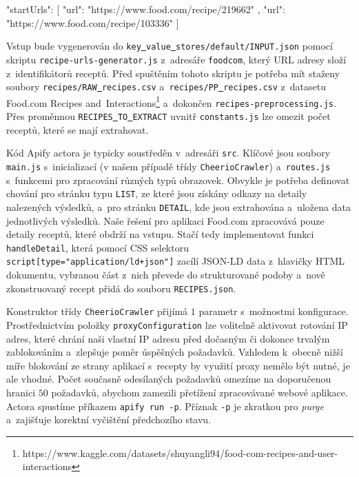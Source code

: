 \begin{code}
{
  "startUrls": [
    {
      "url": "https://www.food.com/recipe/219662"
    },
    {
      "url": "https://www.food.com/recipe/103336"
    }
  ]
}
\end{code}

Vstup bude vygenerován do \texttt{key\underline{{ }}value\underline{{ }}stores/default/INPUT.json} pomocí skriptu \texttt{recipe-urls-generator.js} z~adresáře \texttt{foodcom}, který URL adresy složí z~identifikátorů receptů. Před spuštěním tohoto skriptu je potřeba mít staženy soubory \texttt{recipes/RAW\underline{{ }}recipes.csv} a~\texttt{recipes/PP\underline{{ }}recipes.csv} z~datasetu Food.com Recipes and~Interactions\footnote{https://www.kaggle.com/datasets/shuyangli94/food-com-recipes-and-user-interactions} a~dokončen \texttt{recipes-preprocessing.js}. Přes proměnnou \texttt{RECIPES\underline{{ }}TO\underline{{ }}EXTRACT} uvnitř \texttt{constants.js} lze omezit počet receptů, které se mají extrahovat.

Kód Apify actora je typicky soustředěn v~adresáři \texttt{src}. Klíčové jsou soubory \texttt{main.js} s~inicializací (v našem případě třídy \texttt{CheerioCrawler}) a~\texttt{routes.js} s~funkcemi pro zpracování různých typů obrazovek. Obvykle je potřeba definovat chování pro stránku typu \texttt{LIST}, ze které jsou získány odkazy na detaily nalezených výsledků, a~pro stránku \texttt{DETAIL}, kde jsou extrahována a~uložena data jednotlivých výsledků. Naše řešení pro aplikaci Food.com zpracovává pouze detaily receptů, které obdrží na vstupu. Stačí tedy implementovat funkci \texttt{handleDetail}, která pomocí CSS selektoru \texttt{script[type="application/ld+json"]} zacílí JSON-LD data z~hlavičky HTML dokumentu, vybranou část z~nich převede do strukturované podoby a~nově zkonstruovaný recept přidá do souboru \texttt{RECIPES.json}.

Konstruktor třídy \texttt{CheerioCrawler} přijímá $1$ parametr s~možnostmi konfigurace. Prostřednictvím položky \texttt{proxyConfiguration} lze volitelně aktivovat rotování IP adres, které chrání naši vlastní IP adresu před dočasným či dokonce trvalým zablokováním a~zlepšuje poměr úspěšných požadavků. Vzhledem k~obecně nižší míře blokování ze strany aplikací s~recepty by využití proxy nemělo být nutné, je ale vhodné. Počet současně odesílaných požadavků omezíme na doporučenou hranici $50$ požadavků, abychom zamezili přetížení zpracovávané webové aplikace. Actora spustíme příkazem \texttt{apify\,run\,-p}. Příznak \texttt{-p} je zkratkou pro \emph{purge} a~zajišťuje korektní vyčištění předchozího stavu.

